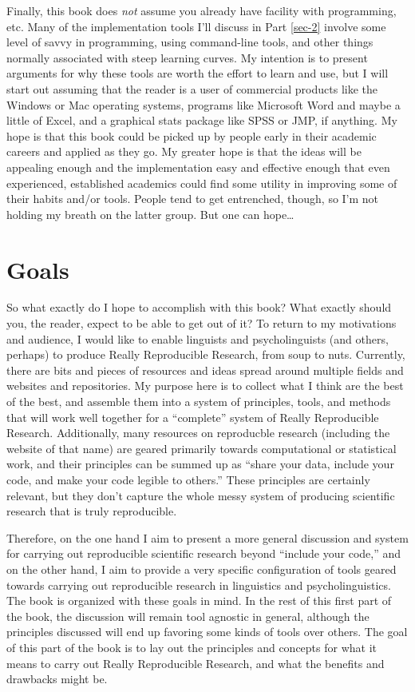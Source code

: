 \documentclass[11pt]{book}
\begin{document}
Finally, this book does \emph{not} assume you already have facility with programming, etc. Many of the implementation tools I'll discuss in Part \ref{sec-2} involve some level of savvy in programming, using command-line tools, and other things normally associated with steep learning curves. My intention is to present arguments for why these tools are worth the effort to learn and use, but I will start out assuming that the reader is a user of commercial products like the Windows or Mac operating systems, programs like Microsoft Word and maybe a little of Excel, and a graphical stats package like SPSS or JMP, if anything.  My hope is that this book could be picked up by people early in their academic careers and applied as they go. My greater hope is that the ideas will be appealing enough and the implementation easy and effective enough that even experienced, established academics could find some utility in improving some of their habits and/or tools.  People tend to get entrenched, though, so I'm not holding my breath on the latter group.  But one can hope\ldots{}
\section{Goals}
\label{sec-1-1-3}

So what exactly do I hope to accomplish with this book?  What exactly should you, the reader, expect to be able to get out of it?  To return to my motivations and audience, I would like to enable linguists and psycholinguists (and others, perhaps) to produce Really Reproducible Research, from soup to nuts.  Currently, there are bits and pieces of resources and ideas spread around multiple fields and websites and repositories. My purpose here is to collect what I think are the best of the best, and assemble them into a system of principles, tools, and methods that will work well together for a ``complete'' system of Really Reproducible Research.  Additionally, many resources on reproducble research (including the website of that name) are geared primarily towards computational or statistical work, and their principles can be summed up as ``share your data, include your code, and make your code legible to others.'' These principles are certainly relevant, but they don't capture the whole messy system of producing scientific research that is truly reproducible.  

Therefore, on the one hand I aim to present a more general discussion and system for carrying out reproducible scientific research beyond ``include your code,'' and on the other hand, I aim to provide a very specific configuration of tools geared towards carrying out reproducible research in linguistics and psycholinguistics.  The book is organized with these goals in mind.  In the rest of this first part of the book, the discussion will remain tool agnostic in general, although the principles discussed will end up favoring some kinds of tools over others.  The goal of this part of the book is to lay out the principles and concepts for what it means to carry out Really Reproducible Research, and what the benefits and drawbacks might be.  
\end{document}
